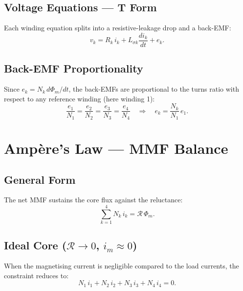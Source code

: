 \documentclass[11pt,a4paper]{article}
\newcommand{\Rel}{\mathcal{R}}          %
\newcommand{\der}[2]{\dfrac{d#1}{d#2}}
\begin{document}
\subsection{Voltage Equations — T Form}

Each winding equation splits into a resistive-leakage drop and a back-EMF:
\begin{equation}
  v_k = R_k\,i_k + L_{\sigma k}\der{i_k}{t} + e_k.
  \label{eq:voltage_T}
\end{equation}

\subsection{Back-EMF Proportionality}

Since $e_k = N_k\,d\Phi_m/dt$, the back-EMFs are proportional to the turns
ratio with respect to any reference winding (here winding 1):
\begin{equation}
  \frac{e_1}{N_1} = \frac{e_2}{N_2} = \frac{e_3}{N_3} = \frac{e_4}{N_4}
  \quad \Longrightarrow \quad
  e_k = \frac{N_k}{N_1}\,e_1.
  \label{eq:emf_ratio}
\end{equation}

\section{Ampère's Law — MMF Balance}

\subsection{General Form}

The net MMF sustains the core flux against the reluctance:
\begin{equation}
  \sum_{k=1}^{4} N_k\,i_k = \Rel\,\Phi_m.
  \label{eq:ampere_general}
\end{equation}

\subsection{Ideal Core ($\Rel \to 0$, $i_m \approx 0$)}

When the magnetising current is negligible compared to the load currents, the
constraint reduces to:
\begin{equation}
  \boxed{N_1\,i_1 + N_2\,i_2 + N_3\,i_3 + N_4\,i_4 = 0.}
  \label{eq:ampere_ideal}
\end{equation}
\end{document}

